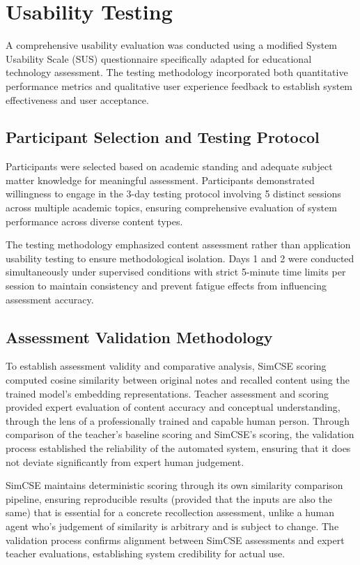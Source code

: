 {\color{maroon}
\section{Usability Testing}
\label{sec:usability_testing}

A comprehensive usability evaluation was conducted using a modified System Usability Scale (SUS) questionnaire specifically adapted for educational technology assessment. The testing methodology incorporated both quantitative performance metrics and qualitative user experience feedback to establish system effectiveness and user acceptance.

\subsection{Participant Selection and Testing Protocol}

Participants were selected based on academic standing and adequate subject matter knowledge for meaningful assessment. Participants demonstrated willingness to engage in the 3-day testing protocol involving 5 distinct sessions across multiple academic topics, ensuring comprehensive evaluation of system performance across diverse content types.

The testing methodology emphasized content assessment rather than application usability testing to ensure methodological isolation. Days 1 and 2 were conducted simultaneously under supervised conditions with strict 5-minute time limits per session to maintain consistency and prevent fatigue effects from influencing assessment accuracy.

\subsection{Assessment Validation Methodology}


To establish assessment validity and comparative analysis, SimCSE scoring computed cosine similarity between original notes and recalled content using the trained model's embedding representations. Teacher assessment and scoring provided expert evaluation of content accuracy and conceptual understanding, through the lens of a professionally trained and capable human person. Through comparison of the teacher's baseline scoring and SimCSE's scoring, the validation process established the reliability of the automated system, ensuring that it does not deviate significantly from expert human judgement.

SimCSE maintains deterministic scoring through its own similarity comparison pipeline, ensuring reproducible results (provided that the inputs are also the same) that is essential for a concrete recollection assessment, unlike a human agent who's judgement of similarity is arbitrary and is subject to change. The validation process confirms alignment between SimCSE assessments and expert teacher evaluations, establishing system credibility for actual use.

}
